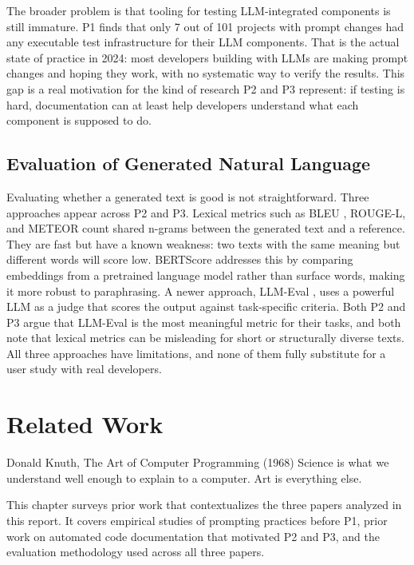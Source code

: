 \documentclass[
    pdftex,
    final,
    11pt,
    a4paper,
    parskip=false,
    oneside,
    footheight=0mm,
    footinclude=false,
    toc=bibliography
]{scrbook}
\begin{document}
The broader problem is that tooling for testing LLM-integrated components is still immature. P1 finds that only 7 out of 101 projects with prompt changes had any executable test infrastructure for their LLM components. That is the actual state of practice in 2024: most developers building with LLMs are making prompt changes and hoping they work, with no systematic way to verify the results. This gap is a real motivation for the kind of research P2 and P3 represent: if testing is hard, documentation can at least help developers understand what each component is supposed to do.

\section{Evaluation of Generated Natural Language}

Evaluating whether a generated text is good is not straightforward. Three approaches appear across P2 and P3. Lexical metrics such as BLEU \cite{Papineni2002}, ROUGE-L, and METEOR count shared n-grams between the generated text and a reference. They are fast but have a known weakness: two texts with the same meaning but different words will score low. BERTScore \cite{Zhang2020} addresses this by comparing embeddings from a pretrained language model rather than surface words, making it more robust to paraphrasing. A newer approach, LLM-Eval \cite{Sun2024}, uses a powerful LLM as a judge that scores the output against task-specific criteria. Both P2 and P3 argue that LLM-Eval is the most meaningful metric for their tasks, and both note that lexical metrics can be misleading for short or structurally diverse texts. All three approaches have limitations, and none of them fully substitute for a user study with real developers.


\chapter{Related Work}
\label{ch:related}

\begin{chapter-quotation}{Donald Knuth, The Art of Computer Programming (1968)}
Science is what we understand well enough to explain to a computer. Art is everything else.
\end{chapter-quotation}

This chapter surveys prior work that contextualizes the three papers analyzed in this report. It covers empirical studies of prompting practices before P1, prior work on automated code documentation that motivated P2 and P3, and the evaluation methodology used across all three papers.
\end{document}
